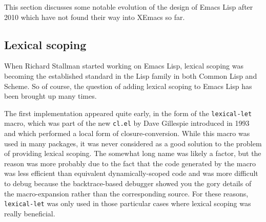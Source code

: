 \documentclass[format=acmsmall, review]{acmart}
\newcommand \Elisp {Emacs Lisp}
\begin{document}
This section discusses some notable evolution of the design of
\Elisp{} after 2010 which have not found their way into XEmacs so far.

\subsection{Lexical scoping}
\label{sec:lexical-scoping}

When Richard Stallman started working on \Elisp, lexical scoping
was becoming the established standard in the Lisp family in both
Common Lisp and Scheme.  So of course, the question of adding lexical
scoping to \Elisp{} has been brought up many times.

The first implementation appeared quite early, in the form of the
\texttt{lexical-let} macro, which was part of the new \texttt{cl.el} by Dave
Gillespie  introduced in 1993 and which
performed a local form of closure-conversion.
While this macro was used in many packages, it was never considered as
a good solution to the problem of providing lexical scoping.
The somewhat long name was likely a factor, but the reason was more probably
due to the fact that the code generated by the macro was less efficient than
equivalent dynamically-scoped code and was more difficult to debug because
the backtrace-based debugger showed you the gory details of the
macro-expansion rather than the corresponding source.  For these reasons,
\texttt{lexical-let} was only used in those particular cases where lexical
scoping was really beneficial.
\end{document}
